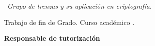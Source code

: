 \thispagestyle{empty}

\hfill

\vfill

\myName\  \textit{Grupo de trenzas y su aplicación en criptografía}.

Trabajo de fin de Grado. Curso académico \myYear.
\medskip

\begin{minipage}[t]{0.25\textwidth}
  \flushleft
  \textbf{Responsable de tutorización}
\end{minipage}
\begin{minipage}[t]{0.45\textwidth}
  \flushleft
  \myProf
  \newline
  \newline
  \myOtherProf
\end{minipage}
\begin{minipage}[t]{0.30\textwidth}
  \flushright
  \myDegree
  \medskip



  \myUni
\end{minipage}
\begin{flushleft}
\end{flushleft}

\endinput
